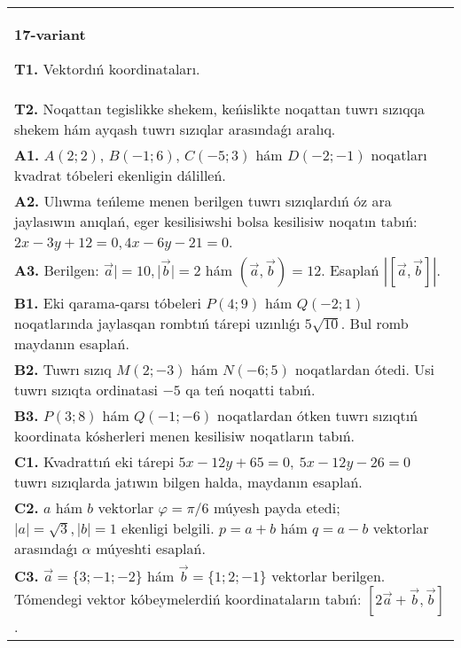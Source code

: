 \documentclass{article}
\begin{document}
\begin{tabular}{m{17cm}}
\textbf{17-variant}

\textbf{T1.} 
Vektordıń koordinataları.
 \\
\textbf{T2.} 
Noqattan tegislikke shekem, keńislikte noqattan tuwrı sızıqqa shekem hám ayqash tuwrı sızıqlar arasındaǵı aralıq.
 \\
\textbf{A1.} 
$A (2;2) $, $B (-1;6) $, $C (-5;3) $ hám $D (-2;-1) $
noqatları kvadrat tóbeleri ekenligin dálilleń.
 \\
\textbf{A2.} 
Ulıwma teńleme menen berilgen tuwrı sızıqlardıń
óz ara jaylasıwın anıqlań, eger kesilisiwshi bolsa kesilisiw noqatın
tabıń: $2x-3y+12=0, 4x-6y-21=0$.
 \\
\textbf{A3.} 
Berilgen: $\overrightarrow{a}| = 10,|\overrightarrow{b}| = 2$ hám
$\left(\overrightarrow{a},\overrightarrow{b} \right) = 12$. Esaplań
$\left| \left\lbrack \overrightarrow{a},\overrightarrow{b} \right\rbrack \right|$.
 \\
\textbf{B1.} 
Eki qarama-qarsı tóbeleri \(P (4;9) \) hám \(Q (-2; 1) \) noqatlarında jaylasqan rombtıń tárepi uzınlıǵı \(5\sqrt{10}\). Bul
romb maydanın esaplań.
 \\
\textbf{B2.} 
Tuwrı sızıq \(M (2;-3) \) hám \(N (-6;5) \) noqatlardan ótedi.
Usi tuwrı sızıqta ordinatasi $-5$ qa teń noqatti tabıń.
 \\
\textbf{B3.} 
\(P (3;8) \) hám \(Q (-1;-6) \) noqatlardan ótken
tuwrı sızıqtıń koordinata kósherleri menen kesilisiw noqatların tabıń.
 \\
\textbf{C1.} 
Kvadrattıń eki tárepi
\(5x-12y+65=0,\ 5x-12y-26=0\) tuwrı sızıqlarda
jatıwın bilgen halda, maydanın esaplań.
 \\
\textbf{C2.} 
$a$ hám $b$ vektorlar $\varphi = \pi/6$ múyesh payda etedi; $|a| = \sqrt{3},|b| = 1$ ekenligi belgili. $p = a + b$ hám $q = a - b$ vektorlar arasındaǵı $\alpha$ múyeshti esaplań.
 \\
\textbf{C3.} 
$\vec{a} = \{ 3; - 1; - 2\}$ hám $\vec{b} = \{ 1;2; - 1\}$ vektorlar berilgen. Tómendegi vektor kóbeymelerdiń koordinataların tabıń:
$\left\lbrack 2\vec{a} + \vec{b},\vec{b} \right\rbrack$.
 \\

\end{tabular}
\vspace{1cm}
\end{document}
